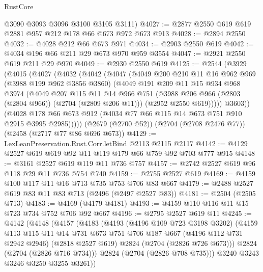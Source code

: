 \begin{lexlean}{RustCore}
\begin{coremodule}
      @3090
      @3093
      @3096
      @3100
      @3105
      @3111)
@4027 := @2877 @2550 @619 @619 @2881 @957 @212 @178 @66 @673 @972 @673 @913
@4028 := @2894 @2550
@4032 := @4028 @212 @66 @673 @971
@4034 := @2903 @2550 @619
@4042 := @4034 @196 @66 @211 @29 @673 @970 @959 @3554
@4047 := @2921 @2550 @619 @211 @29 @970
@4049 := @2930 @2550 @619
@4125 := @2544
    (@3929
      (@4015
        (@4027
          (@4032
            (@4042
              (@4047
                (@4049
                  @200
                  @210
                  @11
                  @16
                  @962
                  @969
                  (@3988 @199 @962 @3856 @3860)
                  (@4049
                    @191
                    @209
                    @11
                    @15
                    @934
                    @968
                    @3974
                    (@4049
                      @207
                      @115
                      @11
                      @14
                      @966
                      @751
                      (@3988 @206 @966 (@2803 (@2804 @966)) (@2704 (@2809 @206 @11)))
                      (@2952 @2550 @619)))))
              @3603))
          (@4028 @178 @66 @673 @912 (@4034 @77 @66 @115 @14 @673 @751 @910 @2915 @3995 @2985)))))
    (@2679 (@2700 @52))
    (@2704 (@2708 @2476 @77))
    (@2458 (@2717 @77 @86 @696 @673))
@4129 := LexLeanPreservation.Rust.Corr.letBind @2113 @2115 @2117
@4142 := @4129 @2527 @619 @619 @92 @11 @119 @179 @66 @759 @92 @703 @777 @915
@4148 := @3161 @2527 @619 @119 @11 @736 @757
@4157 := @2742 @2527 @619 @96 @118 @29 @11 @736 @754 @740
@4159 := @2755 @2527 @619
@4169 := @4159 @100 @117 @11 @16 @713 @735 @753 @706 @83 @667
@4179 := @2488 @2527 @619 @83 @11 @83 @713 (@2496 (@2497 @2527 @83))
@4181 := @2504 (@2505 @713)
@4183 := @4169 (@4179 @4181)
@4193 := @4159 @110 @116 @11 @15 @723 @734 @752 @706 @92 @667
@4196 := @2795 @2527 @619 @11
@4245 := @4142
    (@4148
      (@4157
        (@4183
          (@4193
            (@4196 @109 @723 @3198 @3202)
            (@4159
              @113
              @115
              @11
              @14
              @731
              @673
              @751
              @706
              @187
              @667
              (@4196 @112 @731 @2942 @2946)
              (@2818 @2527 @619)
              @2824
              (@2704 (@2826 @726 @673)))
            @2824
            (@2704 (@2826 @716 @734)))
          @2824
          (@2704 (@2826 @708 @735)))
        @3240
        @3243
        @3246
        @3250
        @3255
        @3261))

\end{coremodule}
\end{lexlean}
